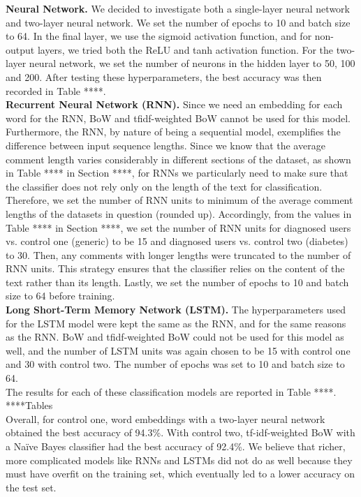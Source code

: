 \documentclass[11pt,a4paper]{article}
\begin{document}
\indent \textbf{Neural Network.} We decided to investigate both a single-layer neural network and two-layer neural network. We set the number of epochs to 10 and batch size to 64. In the final layer, we use the sigmoid activation function, and for non-output layers, we tried both the ReLU and tanh activation function. For the two-layer neural network, we set the number of neurons in the hidden layer to 50, 100 and 200. After testing these hyperparameters, the best accuracy was then recorded in Table ****. \\
\indent \textbf{Recurrent Neural Network (RNN).} Since we need an embedding for each word for the RNN, BoW and tfidf-weighted BoW cannot be used for this model. Furthermore, the RNN, by nature of being a sequential model, exemplifies the difference between input sequence lengths. Since we know that the average comment length varies considerably in different sections of the dataset, as shown in Table **** in Section ****, for RNNs we particularly need to make sure that the classifier does not rely only on the length of the text for classification. Therefore, we set the number of RNN units to minimum of the average comment lengths of the datasets in question (rounded up). Accordingly, from the values in Table **** in Section ****, we set the number of RNN units for diagnosed users vs. control one (generic) to be 15 and diagnosed users vs. control two (diabetes) to 30. Then, any comments with longer lengths were truncated to the number of RNN units. This strategy ensures that the classifier relies on the content of the text rather than its length. Lastly, we set the number of epochs to 10 and batch size to 64 before training. \\
\indent \textbf{Long Short-Term Memory Network (LSTM).} The hyperparameters used for the LSTM model were kept the same as the RNN, and for the same reasons as the RNN. BoW and tfidf-weighted BoW could not be used for this model as well, and the number of LSTM units was again chosen to be 15 with control one and 30 with control two. The number of epochs was set to 10 and batch size to 64. \\
\indent The results for each of these classification models are reported in Table ****. \\
****Tables \\
\indent Overall, for control one, word embeddings with a two-layer neural network obtained the best accuracy of 94.3\%. With control two, tf-idf-weighted BoW with a Naïve Bayes classifier had the best accuracy of 92.4\%. We believe that richer, more complicated models like RNNs and LSTMs did not do as well because they must have overfit on the training set, which eventually led to a lower accuracy on the test set. \\
\end{document}
